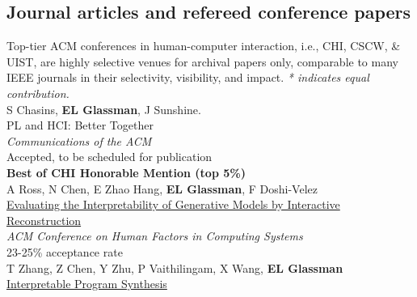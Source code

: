 \documentclass[10pt, a4paper]{article}
\newcommand{\years}[1]{\marginnote{\normalsize #1}}
\begin{document}
\subsection*{Journal articles and refereed conference papers}
\noindent
Top-tier ACM conferences in human-computer interaction, i.e., CHI, CSCW, \& UIST, are highly selective venues for archival papers only, comparable to many IEEE journals in their selectivity, visibility, and impact.
\emph{* indicates equal contribution.}
\\[0.25cm]
\years{CACM}S Chasins, \textbf{EL Glassman}, J Sunshine.\\
PL and HCI: Better Together\\
\emph{Communications of the ACM}\\
Accepted, to be scheduled for publication\\[0.2cm]
\years{2021 CHI}\textbf{Best of CHI Honorable Mention (top 5\%)}\\A Ross, N Chen, E Zhao Hang, \textbf{EL Glassman}, F Doshi-Velez\\
\href{http://glassmanlab.seas.harvard.edu/papers/evalGenModels_chi2021.pdf}{Evaluating the Interpretability of Generative Models by Interactive Reconstruction}\\
\emph{ACM Conference on Human Factors in Computing Systems}\\
23-25\% acceptance rate\\[0.2cm]
\years{2021 CHI} T Zhang, Z Chen, Y Zhu, P Vaithilingam, X Wang, \textbf{EL Glassman}\\
\href{http://glassmanlab.seas.harvard.edu/papers/ips_chi2021.pdf}{Interpretable Program Synthesis}\\
\end{document}
